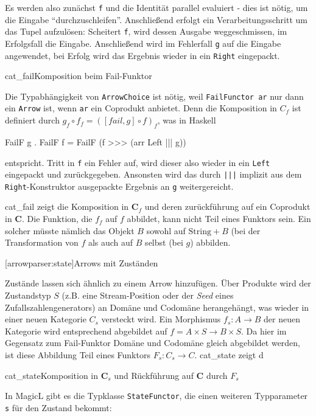 \documentclass[11pt, a4paper, bibgerm]{scrbook}
\newcommand\icode[1]{\lstinline?#1?}
\newcommand\lsection{}
\newcommand\abb{}
\newcommand\fig{}
\newcommand\ato{\rightarrow} %
\begin{document}
Es werden also zunächst \icode{f} und die Identität parallel evaluiert -
dies ist nötig, um die Eingabe "`durchzuschleifen"'. Anschließend
erfolgt ein Verarbeitungsschritt um das Tupel aufzulösen: Scheitert
\icode{f}, wird dessen Ausgabe weggeschmissen, im Erfolgsfall die
Eingabe. Anschließend wird im Fehlerfall \icode{g} auf die Eingabe
angewendet, bei Erfolg wird das Ergebnis wieder in ein \icode{Right} eingepackt.

\fig{cat_fail}{Komposition beim Fail-Funktor}

Die Typabhängigkeit von \icode{ArrowChoice} ist nötig, weil
\icode{FailFunctor ar} nur dann ein \icode{Arrow} ist, wenn \icode{ar}
ein Coprodukt anbietet. Denn die Komposition in $C_{f}$ ist definiert
durch $g_{f} \circ f_{f} = ([fail,g] \circ f)_{f}$, was in Haskell
\begin{code}
FailF g . FailF f = FailF (f >>> (arr Left ||| g))
\end{code} %
entspricht. Tritt in \icode{f} ein Fehler auf, wird dieser also wieder
in ein \icode{Left} eingepackt und zurückgegeben. Ansonsten wird das
durch \icode{|||} implizit aus dem \icode{Right}-Konstruktor ausgepackte
Ergebnis an \icode{g} weitergereicht.

\abb{cat_fail} zeigt die Komposition in $\mathbf{C}_f$ und deren
zurückführung auf ein Coprodukt in $\mathbf{C}$. Die Funktion, die $f_f$
auf $f$ abbildet, kann nicht Teil eines Funktors sein. Ein solcher
müsste nämlich das Objekt $B$ sowohl auf $\mathrm{String}+B$ (bei der
Transformation von $f$ als auch auf $B$ selbst (bei $g$) abbilden.

\lsection[arrowparser:state]{Arrows mit Zuständen}

Zustände lassen sich ähnlich zu einem Arrow hinzufügen. Über Produkte
wird der Zustandstyp $S$ (z.B. eine Stream-Position oder der
\textit{Seed} eines Zufallszahlengenerators) an Domäne und Codomäne
herangehängt, was wieder in einer neuen Kategorie $C_{s}$ versteckt
wird. Ein Morphismus $f_{s} : A \rightarrow B$ der neuen Kategorie wird
entsprechend abgebildet auf $f = A \times S \rightarrow B \times S$. Da
hier im Gegensatz zum Fail-Funktor Domäne und Codomäne gleich abgebildet
werden, ist diese Abbildung Teil eines Funktors $F_s: C_{s}
\ato C$. \abb{cat_state} zeigt d

\fig{cat_state}{Komposition in $\mathbf{C}_s$ und Rückführung auf
  $\mathbf{C}$ durch $F_s$}

In MagicL gibt es die Typklasse \icode{StateFunctor}, die einen weiteren
Typparameter \icode{s} für den Zustand bekommt:
\end{document}
